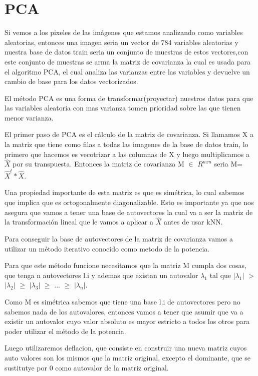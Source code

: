 \section{PCA}
Si vemos a los pixeles de las imágenes que estamos analizando como variables aleatorias, entonces una imagen seria un vector de 784 variables aleatorias y nuestra base de datos train seria un conjunto de muestras de estos vectores,con este conjunto de muestras se arma la matriz de covarianza la cual es usada para el algoritmo PCA, el cual analiza las varianzas entre las variables y devuelve un cambio de base para los datos vectorizados. \par
\indent El método PCA es una forma de transformar(proyectar) nuestros datos para que las variables aleatoria con mas varianza tomen prioridad sobre las que tienen menor varianza.\par
\indent El primer paso de PCA es el cálculo de la matriz de covarianza. Si llamamos X a la matriz que tiene como filas a todas las imagenes de la base de datos train, lo primero que hacemos es vecotrizar a las columnas de X y luego multiplicamos a $\hat{X}$ por su transpuesta. Entonces la matriz de covarianza M $\in$ $R^{nxn}$  seria M=$\hat{X}^{t}*\hat{X}$. \par
\indent Una propiedad importante de esta matriz es que es simétrica, lo cual sabemos que implica que es ortogonalmente diagonalizable. Esto es importante ya que nos asegura que vamos a tener una base de autovectores la cual va a ser la matriz de la transformación lineal que le vamos a aplicar a $\hat{X}$ antes de usar kNN. \par
\indent Para conseguir la base de autovectores de la matriz de covarianza vamos a utilizar un método iterativo conocido como metodo de la potencia. \par
\indent Para que este método funcione necesitamos que la matriz M cumpla dos cosas, que tenga n autovectores l.i y ademas que existan un autovalor $\lambda_1$ tal que $|\lambda_1|$ $>$ $|\lambda_2|$ $\geq$ $|\lambda_3|$ $\geq$ ... $\geq$ $|\lambda_n|$. \par
\indent Como M es simétrica sabemos que tiene una base l.i de autovectores pero no sabemos nada de los autovalores, entonces vamos a tener que asumir que va a existir un autovalor cuyo valor absoluto es mayor estricto a todos los otros para poder utilizar el método de la potencia.\par
\ident Luego utilizaremos deflacion, que consiste en construir una nueva matriz cuyos auto valores 	son los mismos que la matriz original, excepto el dominante, que se sustitutye por 0 como autovalor de la matriz original.\par
